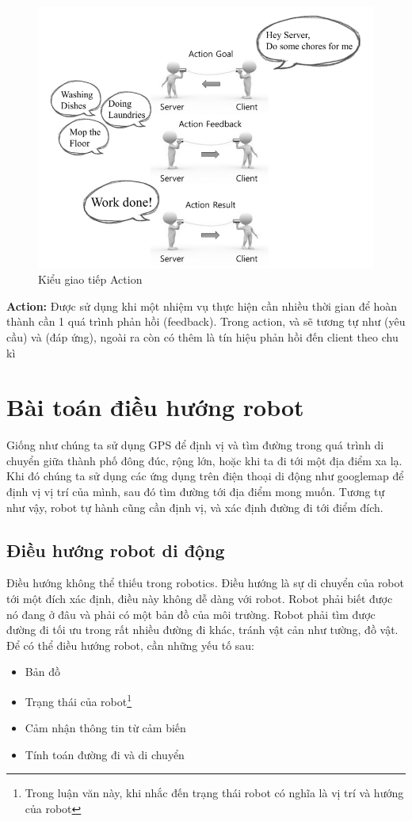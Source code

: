 \begin{figure}[htbp]
  \centering
  \includegraphics[width=0.8\linewidth]{figures/action.png}
  \caption{Kiểu giao tiếp Action}
  \label{fig:action}
\end{figure}
\textbf{Action:} Được sử dụng khi một nhiệm vụ thực hiện cần nhiều thời gian để hoàn thành cần 1 quá trình phản hồi (feedback). Trong action,  và  sẽ tương tự như  (yêu cầu) và (đáp ứng), ngoài ra còn có thêm  là tín hiệu phản hồi đến client theo chu kì


\section{Bài toán điều hướng robot }


Giống như chúng ta sử dụng GPS để định vị và tìm đường trong quá trình di chuyển giữa thành phố đông đúc, rộng lớn, hoặc khi ta đi tới một địa điểm xa lạ. Khi đó chúng ta sử dụng các ứng dụng trên điện thoại di động như googlemap để định vị vị trí của mình, sau đó tìm đường tới địa điểm mong muốn. Tương tự như vậy, robot tự hành cũng cần định vị, và xác định đường đi tới điểm đích.

\subsection{Điều hướng robot di động}

Điều hướng không thể thiếu trong robotics. Điều hướng là sự di chuyển của robot tới một đích xác định, điều này không dễ dàng với robot. Robot phải biết được nó đang ở đâu và phải có một bản đồ của môi trường. Robot phải tìm được đường đi tối ưu trong rất nhiều đường đi khác, tránh vật cản như tường, đồ vật. Để có thể điều hướng robot, cần những yếu tố sau:
\begin{itemize}
  \item Bản đồ
  \item Trạng thái của robot\footnote{Trong luận văn này, khi nhắc đến trạng thái robot có nghĩa là vị trí và hướng của robot}
  \item Cảm nhận thông tin từ cảm biến
  \item Tính toán đường đi và di chuyển
\end{itemize}

